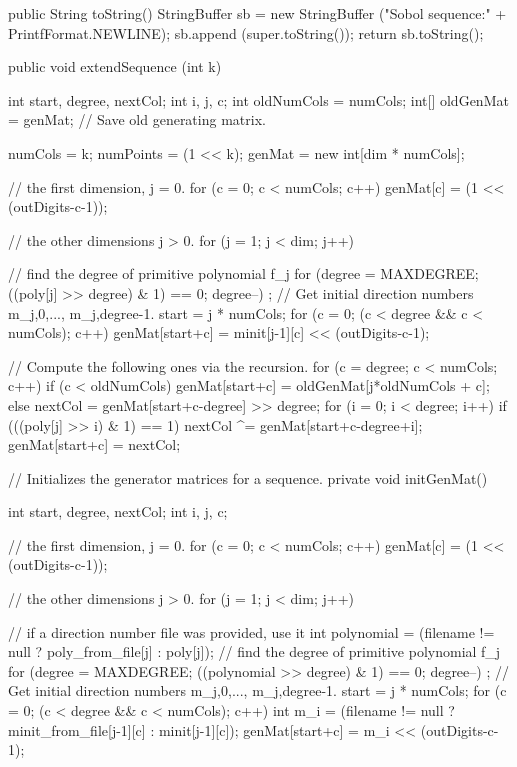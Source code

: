 \begin{code}\begin{hide} 

   public String toString() {
      StringBuffer sb = new StringBuffer ("Sobol sequence:" +
                                           PrintfFormat.NEWLINE);
      sb.append (super.toString());
      return sb.toString();
   }


   public void extendSequence (int k) {
      int start, degree, nextCol;
      int i, j, c;
      int oldNumCols = numCols;
      int[] oldGenMat = genMat;  // Save old generating matrix.
 
      numCols   = k;
      numPoints = (1 << k);
      genMat = new int[dim * numCols];

      // the first dimension, j = 0.
      for (c = 0; c < numCols; c++)
         genMat[c] = (1 << (outDigits-c-1));

      // the other dimensions j > 0.
      for (j = 1; j < dim; j++) {
         // find the degree of primitive polynomial f_j
         for (degree = MAXDEGREE;  ((poly[j] >> degree) & 1) == 0; degree--)
            ;
         // Get initial direction numbers m_{j,0},..., m_{j,degree-1}.
         start = j * numCols;
         for (c = 0; (c < degree && c < numCols); c++)
            genMat[start+c] = minit[j-1][c] << (outDigits-c-1);

         // Compute the following ones via the recursion.
         for (c = degree; c < numCols; c++) {
            if (c < oldNumCols)
               genMat[start+c] = oldGenMat[j*oldNumCols + c];
            else {
               nextCol = genMat[start+c-degree] >> degree;
               for (i = 0; i < degree; i++)
                  if (((poly[j] >> i) & 1) == 1)
                     nextCol ^= genMat[start+c-degree+i];
               genMat[start+c] = nextCol;
            }
         }
      } 
   }


   // Initializes the generator matrices for a sequence.
   private void initGenMat()  {
      int start, degree, nextCol;
      int i, j, c;

      // the first dimension, j = 0.
      for (c = 0; c < numCols; c++)
         genMat[c] = (1 << (outDigits-c-1));

      // the other dimensions j > 0.
      for (j = 1; j < dim; j++) {
         // if a direction number file was provided, use it
         int polynomial = (filename != null ? poly_from_file[j] : poly[j]);
         // find the degree of primitive polynomial f_j
         for (degree = MAXDEGREE; ((polynomial >> degree) & 1) == 0; degree--)
            ;
         // Get initial direction numbers m_{j,0},..., m_{j,degree-1}.
         start = j * numCols;
         for (c = 0; (c < degree && c < numCols); c++) {
             int m_i = (filename != null ? 
                        minit_from_file[j-1][c] : minit[j-1][c]);
             genMat[start+c] = m_i << (outDigits-c-1);
         }

}}
\end{hide}
\end{code}
